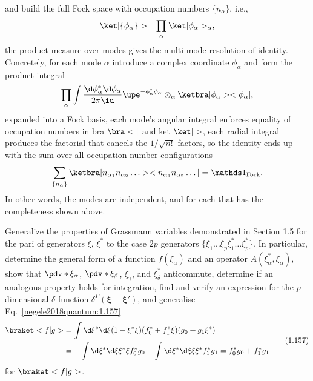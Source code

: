 \begin{solution}
  and build the full Fock space with occupation numbers $\{n_\alpha\}$, i.e.,
  \[
    \ket|\{\phi_\alpha\}> = \prod_\alpha \ket|\phi_\alpha>_\alpha,
  \]
  the product measure over modes gives the multi-mode resolution of identity.
  Concretely, for each mode $\alpha$ introduce a complex coordinate
  $\phi_\alpha$ and form the product integral
  \[
    \prod_\alpha \int \frac{\d\phi_\alpha^* \d\phi_\alpha}{2\pi\iu}
    \upe^{-\phi_\alpha^*\phi_\alpha} \otimes_\alpha
    \ketbra|\phi_\alpha><\phi_\alpha|,
  \]
  expanded into a Fock basis, each mode's angular integral enforces equality of
  occupation numbers in bra $\bra<|$ and ket $\ket|>$, each radial integral
  produces the factorial that cancels the $1/\sqrt{n!}$ factors,
  so the identity ends up with the sum over all occupation-number configurations
  \[
    \sum_{\{n_\alpha\}}
    \ketbra|n_{\alpha_1} n_{\alpha_2} \ldots><n_{\alpha_1} n_{\alpha_2} \ldots|
  = \identity_\text{Fock}.
  \]
  In other words, the modes are independent, and for each that has the
  completeness shown above.
\end{solution}
\newpage
\begin{problem}
  Generalize the properties of Grassmann variables demonstrated in Section 1.5
  for the pari of generators $\xi$, $\xi^*$ to the case $2p$ generators
  $\{\xi_1 \ldots \xi_p\xi_1^* \ldots \xi_p^*\}$. In particular, determine the
  general form of a function $f(\xi_\alpha)$ and an operator
  $A(\xi_\alpha^*, \xi_\alpha)$, show that $\pdv*{}{\xi_\alpha}$,
  $\pdv*{}{\xi_\beta}$, $\xi_\gamma$, and $\xi_\delta^*$ anticommute, determine
  if an analogous property holds for integration, find and verify an expression
  for the $p$-dimensional $\delta$-function $\delta^P(\bm \xi - \bm \xi')$, and
  generalise Eq.~\eqref{negele2018quantum:1.157}
  \begin{equation}
    \begin{aligned}
      \braket<f|g>
  & = \int \d\xi^* \d\xi (1 - \xi^*\xi) (f_0^* + f_1^*\xi) (g_0 + g_1\xi^*)\\
  & = -\int \d\xi^* \d\xi \xi^* \xi f_0^* g_0
    + \int \d\xi^* \d\xi \xi \xi^* f_1^*g_1 = f_0^* g_0 + f_1^* g_1
    \end{aligned}
    \tag{1.157} \label{negele2018quantum:1.157}
  \end{equation}
  for $\braket<f|g>$.
\end{problem}

